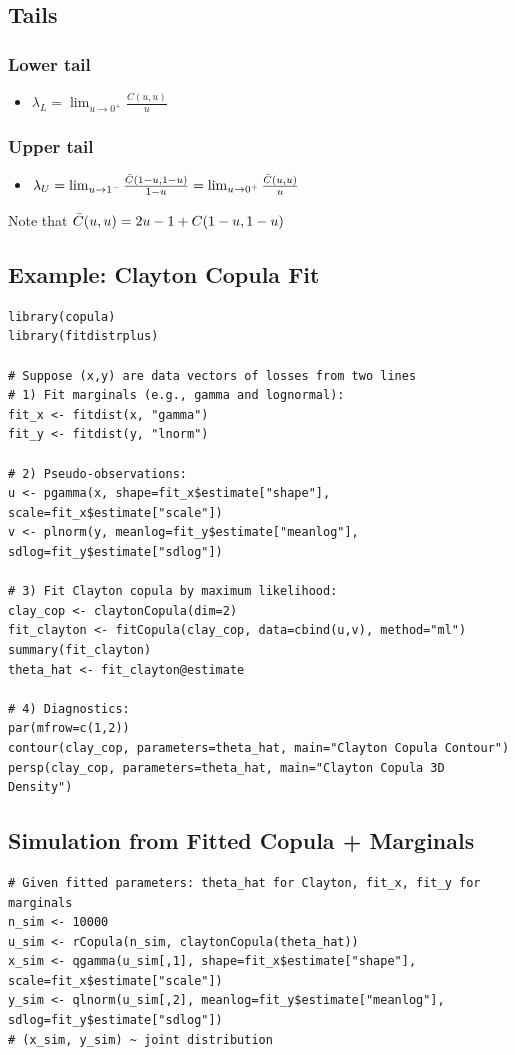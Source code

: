 \documentclass{article}
\begin{document}
\subsection{Tails}

\subsubsection{Lower tail}
\begin{itemize}
    \item $\lambda_L = \lim_{u \rightarrow 0^+} \frac{C(u,u)}{u}$
\end{itemize}

\subsubsection{Upper tail}
\begin{itemize}
    \item $\lambda_U = \lim_{u \rightarrow 1^-} \frac{\Bar{C}(1-u,1-u)}{1-u} = \lim_{u \rightarrow 0^+} \frac{\Bar{C}(u,u)}{u}$
\end{itemize}


\noindent Note that $\Bar{C}(u,u) = 2u - 1 + C(1-u, 1-u)$

\subsection{Example: Clayton Copula Fit}
\begin{lstlisting}
library(copula)
library(fitdistrplus)

# Suppose (x,y) are data vectors of losses from two lines
# 1) Fit marginals (e.g., gamma and lognormal):
fit_x <- fitdist(x, "gamma")
fit_y <- fitdist(y, "lnorm")

# 2) Pseudo-observations:
u <- pgamma(x, shape=fit_x$estimate["shape"], scale=fit_x$estimate["scale"])
v <- plnorm(y, meanlog=fit_y$estimate["meanlog"], sdlog=fit_y$estimate["sdlog"])

# 3) Fit Clayton copula by maximum likelihood:
clay_cop <- claytonCopula(dim=2)
fit_clayton <- fitCopula(clay_cop, data=cbind(u,v), method="ml")
summary(fit_clayton)
theta_hat <- fit_clayton@estimate

# 4) Diagnostics:
par(mfrow=c(1,2))
contour(clay_cop, parameters=theta_hat, main="Clayton Copula Contour")
persp(clay_cop, parameters=theta_hat, main="Clayton Copula 3D Density")
\end{lstlisting}

\subsection{Simulation from Fitted Copula + Marginals}
\begin{lstlisting}
# Given fitted parameters: theta_hat for Clayton, fit_x, fit_y for marginals
n_sim <- 10000
u_sim <- rCopula(n_sim, claytonCopula(theta_hat))
x_sim <- qgamma(u_sim[,1], shape=fit_x$estimate["shape"], scale=fit_x$estimate["scale"])
y_sim <- qlnorm(u_sim[,2], meanlog=fit_y$estimate["meanlog"], sdlog=fit_y$estimate["sdlog"])
# (x_sim, y_sim) ~ joint distribution
\end{lstlisting}
\end{document}
